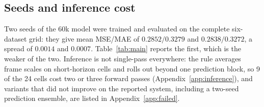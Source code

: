 \subsection{Seeds and inference cost}
\label{sec:seeds}

Two seeds of the 60k model were trained and evaluated on the complete six-dataset grid: they give
mean MSE/MAE of $0.2852/0.3279$ and $0.2838/0.3272$, a spread of $0.0014$ and $0.0007$.
Table~\ref{tab:main} reports the first, which is the weaker of the two. Inference is not single-pass everywhere: the rule averages
frame scales on short-horizon cells and rolls out beyond one prediction block, so 9 of the 24 cells cost two or three
forward passes (Appendix~\ref{app:inference}), and variants that did not improve on the
reported system, including a two-seed prediction ensemble, are listed in Appendix~\ref{app:failed}.
